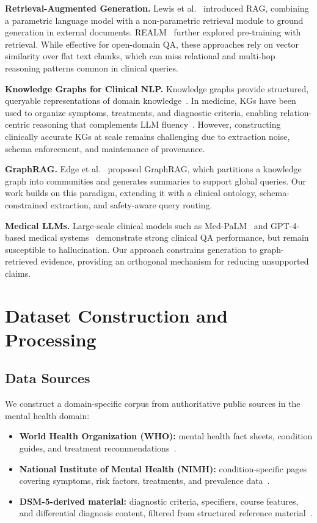 \documentclass[12pt,a4paper]{article}
\begin{document}
\textbf{Retrieval-Augmented Generation.}
Lewis et al.~\cite{lewis2020rag} introduced RAG, combining a parametric language model with a non-parametric retrieval module to ground generation in external documents. REALM~\cite{guu2020realm} further explored pre-training with retrieval. While effective for open-domain QA, these approaches rely on vector similarity over flat text chunks, which can miss relational and multi-hop reasoning patterns common in clinical queries.

\textbf{Knowledge Graphs for Clinical NLP.}
Knowledge graphs provide structured, queryable representations of domain knowledge~\cite{hogan2021kg}. In medicine, KGs have been used to organize symptoms, treatments, and diagnostic criteria, enabling relation-centric reasoning that complements LLM fluency~\cite{pan2024kgrag}. However, constructing clinically accurate KGs at scale remains challenging due to extraction noise, schema enforcement, and maintenance of provenance.

\textbf{GraphRAG.}
Edge et al.~\cite{edge2024graphrag} proposed GraphRAG, which partitions a knowledge graph into communities and generates summaries to support global queries. Our work builds on this paradigm, extending it with a clinical ontology, schema-constrained extraction, and safety-aware query routing.

\textbf{Medical LLMs.}
Large-scale clinical models such as Med-PaLM~\cite{singhal2023medpalm} and GPT-4-based medical systems~\cite{nori2023medllm} demonstrate strong clinical QA performance, but remain susceptible to hallucination. Our approach constrains generation to graph-retrieved evidence, providing an orthogonal mechanism for reducing unsupported claims.

\section{Dataset Construction and Processing}

\subsection{Data Sources}

We construct a domain-specific corpus from authoritative public sources in the mental health domain:
\begin{itemize}[nosep]
    \item \textbf{World Health Organization (WHO):} mental health fact sheets, condition guides, and treatment recommendations~\cite{who2024mental}.
    \item \textbf{National Institute of Mental Health (NIMH):} condition-specific pages covering symptoms, risk factors, treatments, and prevalence data~\cite{nimh2024mental}.
    \item \textbf{DSM-5-derived material:} diagnostic criteria, specifiers, course features, and differential diagnosis content, filtered from structured reference material~\cite{apa2013dsm5}.
\end{itemize}
\end{document}

